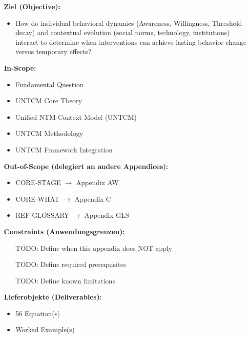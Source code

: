 \begin{tcolorbox}[
    colback=orange!5!white,
    colframe=orange!75!black,
    title={\textbf{Appendix Scope: Ziel / In-Scope / Out-of-Scope / Constraints}},
    fonttitle=\bfseries
]

\textbf{Ziel (Objective):}
\begin{itemize}[nosep]
    \item How do individual behavioral dynamics (Awareness, Willingness, Threshold decay) and contextual evolution (social norms, technology, institutions) interact to determine when interventions can achieve lasting behavior change versus temporary effects?
\end{itemize}

\textbf{In-Scope:}
\begin{itemize}[nosep]
    \item Fundamental Question
    \item UNTCM Core Theory
    \item Unified NTM-Context Model (UNTCM)
    \item UNTCM Methodology
    \item UNTCM Framework Integration
\end{itemize}

\textbf{Out-of-Scope (delegiert an andere Appendices):}
\begin{itemize}[nosep]
    \item CORE-STAGE $\rightarrow$ Appendix AW
    \item CORE-WHAT $\rightarrow$ Appendix C
    \item REF-GLOSSARY $\rightarrow$ Appendix GLS
\end{itemize}

\textbf{Constraints (Anwendungsgrenzen):}
\begin{itemize}[nosep]
    \item [TODO: Define when this appendix does NOT apply]
    \item [TODO: Define required prerequisites]
    \item [TODO: Define known limitations]
\end{itemize}

\textbf{Lieferobjekte (Deliverables):}
\begin{itemize}[nosep]
    \item 56 Equation(s)
    \item Worked Example(s)
\end{itemize}

\end{tcolorbox}


